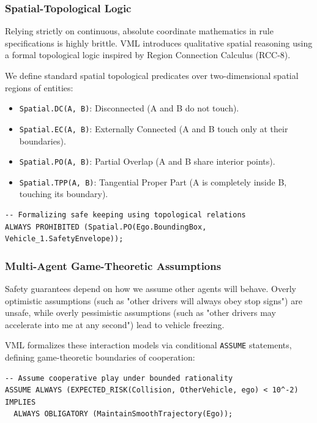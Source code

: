 \documentclass[11pt,a4paper]{article}
\begin{document}
\subsubsection{Spatial-Topological Logic}
Relying strictly on continuous, absolute coordinate mathematics in rule specifications is highly brittle. VML introduces qualitative spatial reasoning using a formal topological logic inspired by Region Connection Calculus (RCC-8).

We define standard spatial topological predicates over two-dimensional spatial regions of entities:

\begin{itemize}
    \item \texttt{Spatial.DC(A, B)}: Disconnected (A and B do not touch).
    \item \texttt{Spatial.EC(A, B)}: Externally Connected (A and B touch only at their boundaries).
    \item \texttt{Spatial.PO(A, B)}: Partial Overlap (A and B share interior points).
    \item \texttt{Spatial.TPP(A, B)}: Tangential Proper Part (A is completely inside B, touching its boundary).
\end{itemize}

\begin{lstlisting}
-- Formalizing safe keeping using topological relations
ALWAYS PROHIBITED (Spatial.PO(Ego.BoundingBox, Vehicle_1.SafetyEnvelope));
\end{lstlisting}

\subsubsection{Multi-Agent Game-Theoretic Assumptions}
Safety guarantees depend on how we assume other agents will behave. Overly optimistic assumptions (such as "other drivers will always obey stop signs") are unsafe, while overly pessimistic assumptions (such as "other drivers may accelerate into me at any second") lead to vehicle freezing.

VML formalizes these interaction models via conditional \texttt{ASSUME} statements, defining game-theoretic boundaries of cooperation:

\begin{lstlisting}
-- Assume cooperative play under bounded rationality
ASSUME ALWAYS (EXPECTED_RISK(Collision, OtherVehicle, ego) < 10^-2)
IMPLIES
  ALWAYS OBLIGATORY (MaintainSmoothTrajectory(Ego));
\end{lstlisting}
\end{document}
